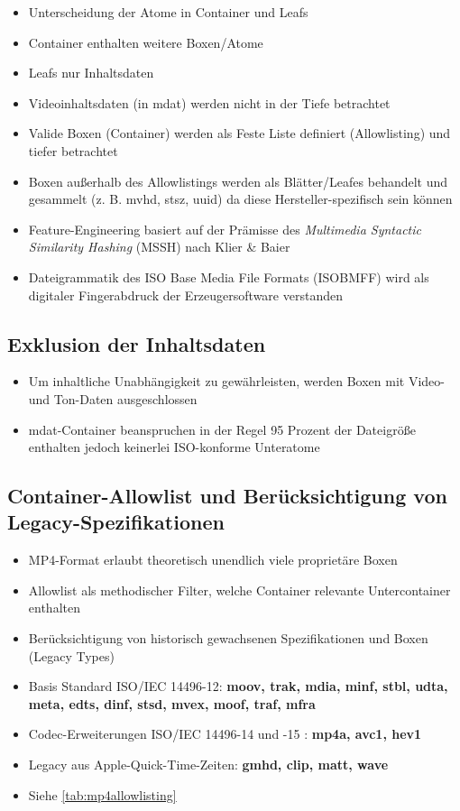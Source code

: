 \begin{itemize}
    \item Unterscheidung der Atome in Container und Leafs
    \item Container enthalten weitere Boxen/Atome
    \item Leafs nur Inhaltsdaten
    \item Videoinhaltsdaten (in mdat) werden nicht in der Tiefe betrachtet
    \item Valide Boxen (Container) werden als Feste Liste definiert (Allowlisting) und tiefer betrachtet
    \item Boxen außerhalb des Allowlistings werden als Blätter/Leafes behandelt und gesammelt (z. B. mvhd, stsz, uuid) da diese Hersteller-spezifisch sein können
    \item Feature-Engineering basiert auf der Prämisse des \textit{Multimedia Syntactic Similarity Hashing} (MSSH) nach Klier \& Baier \cite{klier_media_2025}
    \item Dateigrammatik des ISO Base Media File Formats (ISOBMFF) wird als digitaler Fingerabdruck der Erzeugersoftware verstanden 
\end{itemize}


\subsection{Exklusion der Inhaltsdaten}
\begin{itemize}
    \item Um inhaltliche Unabhängigkeit zu gewährleisten, werden Boxen mit Video- und Ton-Daten ausgeschlossen
    \item mdat-Container beanspruchen in der Regel 95 Prozent der Dateigröße enthalten jedoch keinerlei ISO-konforme Unteratome
\end{itemize}


\subsection{Container-Allowlist und Berücksichtigung von Legacy-Spezifikationen}

\begin{itemize}
    \item MP4-Format erlaubt theoretisch unendlich viele proprietäre Boxen
    \item Allowlist als methodischer Filter, welche Container relevante Untercontainer enthalten
    \item Berücksichtigung von historisch gewachsenen Spezifikationen und Boxen (Legacy Types) 
    \item Basis Standard ISO/IEC 14496-12: \textbf{moov, trak, mdia, minf, stbl, udta, meta, edts, dinf, stsd, mvex, moof, traf, mfra} \cite{iso_14496-12_2022}
    \item Codec-Erweiterungen ISO/IEC 14496-14 und -15 : \textbf{mp4a, avc1, hev1} \cite{iso_14496-14_2020}\cite{iso_14496-15_2024}
    \item Legacy aus Apple-Quick-Time-Zeiten: \textbf{gmhd, clip, matt, wave}\cite{apple_quicktime_2001}
    \item Siehe \cref{tab:mp4allowlisting}
\end{itemize}

